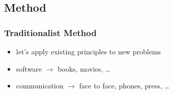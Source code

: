 \documentclass[dvipsnames]{beamer}
\begin{document}
%
%
%
%
%
%

\subsection{Method}

\begin{frame}
  \frametitle{Traditionalist Method}

  \begin{itemize}
    \item let's apply existing principles to new problems

    \bigskip
    \item software $\rightarrow$ books, movies, \ldots
    \item communication $\rightarrow$ face to face, phones, press, \ldots
  \end{itemize}
\end{frame}
\end{document}
